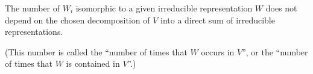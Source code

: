The number of $W_i$ isomorphic to a given irreducible representation $W$ does not depend on the chosen decomposition of $V$ into a direct sum of irreducible representations.

(This number is called the ``number of times that $W$ occurs in $V$'', or the ``number of times that $W$ is contained in $V$''.)